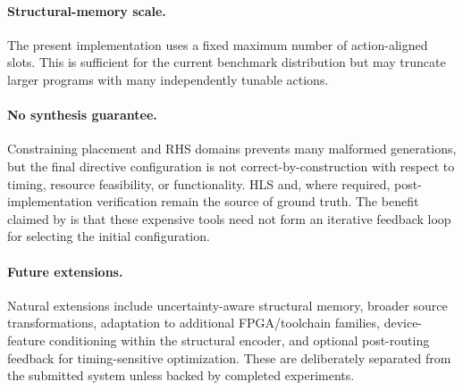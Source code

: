 \paragraph{Structural-memory scale.}
The present implementation uses a fixed maximum number of action-aligned slots. This is sufficient for the current benchmark distribution but may truncate larger programs with many independently tunable actions. 

\paragraph{No synthesis guarantee.}
Constraining placement and RHS domains prevents many malformed generations, but the final directive configuration is not correct-by-construction with respect to timing, resource feasibility, or functionality. HLS and, where required, post-implementation verification remain the source of ground truth. The benefit claimed by \framework is that these expensive tools need not form an iterative feedback loop for selecting the initial configuration.

\paragraph{Future extensions.}
Natural extensions include uncertainty-aware structural memory, broader source transformations, adaptation to additional FPGA/toolchain families, device-feature conditioning within the structural encoder, and optional post-routing feedback for timing-sensitive optimization. These are deliberately separated from the submitted system unless backed by completed experiments.
